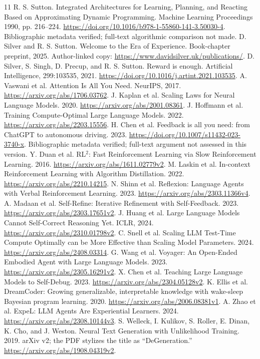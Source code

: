 \documentclass[11pt]{article}
\begin{document}
\begingroup\small
\begin{thebibliography}{11}
 R. S. Sutton. Integrated Architectures for Learning,
Planning, and Reacting Based on Approximating Dynamic Programming.
Machine Learning Proceedings 1990, pp. 216--224.
\url{https://doi.org/10.1016/b978-1-55860-141-3.50030-4}.
Bibliographic metadata verified; full-text algorithmic comparison not made.
 D. Silver and R. S. Sutton. Welcome to the Era of Experience.
Book-chapter preprint, 2025. Author-linked copy:
\url{https://www.davidsilver.uk/publications/}.
 D. Silver, S. Singh, D. Precup, and R. S. Sutton.
Reward is enough. Artificial Intelligence, 299:103535, 2021.
\url{https://doi.org/10.1016/j.artint.2021.103535}.
 A. Vaswani et al. Attention Is All You Need. NeurIPS, 2017.
\url{https://arxiv.org/abs/1706.03762}.
 J. Kaplan et al. Scaling Laws for Neural Language Models. 2020.
\url{https://arxiv.org/abs/2001.08361}.
 J. Hoffmann et al. Training Compute-Optimal Large Language Models. 2022.
\url{https://arxiv.org/abs/2203.15556}.
 H. Chen et al. Feedback is all you need: from ChatGPT to autonomous driving. 2023.
\url{https://doi.org/10.1007/s11432-023-3740-x}. Bibliographic metadata verified;
full-text argument not assessed in this version.
 Y. Duan et al. RL$^2$: Fast Reinforcement Learning via Slow Reinforcement Learning. 2016.
\url{https://arxiv.org/abs/1611.02779v2}.
 M. Laskin et al. In-context Reinforcement Learning with Algorithm Distillation. 2022.
\url{https://arxiv.org/abs/2210.14215}.
 N. Shinn et al. Reflexion: Language Agents with Verbal Reinforcement Learning. 2023.
\url{https://arxiv.org/abs/2303.11366v4}.
 A. Madaan et al. Self-Refine: Iterative Refinement with Self-Feedback. 2023.
\url{https://arxiv.org/abs/2303.17651v2}.
 J. Huang et al. Large Language Models Cannot Self-Correct Reasoning Yet. ICLR, 2024.
\url{https://arxiv.org/abs/2310.01798v2}.
 C. Snell et al. Scaling LLM Test-Time Compute Optimally can be More Effective than Scaling Model Parameters. 2024.
\url{https://arxiv.org/abs/2408.03314}.
 G. Wang et al. Voyager: An Open-Ended Embodied Agent with Large Language Models. 2023.
\url{https://arxiv.org/abs/2305.16291v2}.
 X. Chen et al. Teaching Large Language Models to Self-Debug. 2023.
\url{https://arxiv.org/abs/2304.05128v2}.
 K. Ellis et al. DreamCoder: Growing generalizable,
interpretable knowledge with wake-sleep Bayesian program learning. 2020.
\url{https://arxiv.org/abs/2006.08381v1}.
 A. Zhao et al. ExpeL: LLM Agents Are Experiential Learners. 2024.
\url{https://arxiv.org/abs/2308.10144v3}.
 S. Welleck, I. Kulikov, S. Roller, E. Dinan,
K. Cho, and J. Weston. Neural Text Generation with Unlikelihood Training.
2019. arXiv v2; the PDF stylizes the title as ``DeGeneration.''
\url{https://arxiv.org/abs/1908.04319v2}.
\end{thebibliography}
\endgroup
\end{document}

